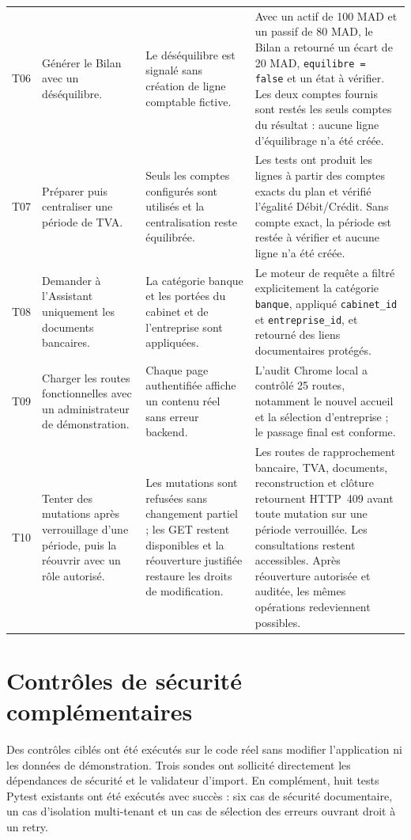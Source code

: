 \documentclass[12pt,a4paper,oneside]{report}
\begin{document}
\begin{longtable}{|L{0.75cm}|L{3.3cm}|L{4.5cm}|L{5.6cm}|}
T06 & Générer le Bilan avec un déséquilibre. & Le déséquilibre est signalé sans création de ligne comptable fictive. & Avec un actif de 100 MAD et un passif de 80 MAD, le Bilan a retourné un écart de 20 MAD, \texttt{equilibre = false} et un état à vérifier. Les deux comptes fournis sont restés les seuls comptes du résultat : aucune ligne d'équilibrage n'a été créée. \\
T07 & Préparer puis centraliser une période de TVA. & Seuls les comptes configurés sont utilisés et la centralisation reste équilibrée. & Les tests ont produit les lignes à partir des comptes exacts du plan et vérifié l'égalité Débit/Crédit. Sans compte exact, la période est restée à vérifier et aucune ligne n'a été créée. \\
T08 & Demander à l'Assistant uniquement les documents bancaires. & La catégorie banque et les portées du cabinet et de l'entreprise sont appliquées. & Le moteur de requête a filtré explicitement la catégorie \texttt{banque}, appliqué \texttt{cabinet\_id} et \texttt{entreprise\_id}, et retourné des liens documentaires protégés. \\
T09 & Charger les routes fonctionnelles avec un administrateur de démonstration. & Chaque page authentifiée affiche un contenu réel sans erreur backend. & L'audit Chrome local a contrôlé 25 routes, notamment le nouvel accueil et la sélection d'entreprise ; le passage final est conforme. \\
T10 & Tenter des mutations après verrouillage d'une période, puis la réouvrir avec un rôle autorisé. & Les mutations sont refusées sans changement partiel ; les GET restent disponibles et la réouverture justifiée restaure les droits de modification. & Les routes de rapprochement bancaire, TVA, documents, reconstruction et clôture retournent HTTP~409 avant toute mutation sur une période verrouillée. Les consultations restent accessibles. Après réouverture autorisée et auditée, les mêmes opérations redeviennent possibles. \\
\bottomrule
\end{longtable}
\normalsize

\section{Contrôles de sécurité complémentaires}

Des contrôles ciblés ont été exécutés sur le code réel sans modifier
l'application ni les données de démonstration. Trois sondes ont sollicité
directement les dépendances de sécurité et le validateur d'import. En
complément, huit tests Pytest existants ont été exécutés avec succès : six cas
de sécurité documentaire, un cas d'isolation multi-tenant et un cas de
sélection des erreurs ouvrant droit à un retry.
\end{document}
